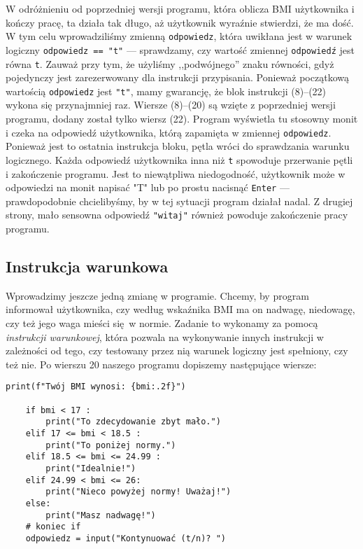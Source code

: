 \documentclass[a4paper]{article}
\begin{document}
W odróżnieniu od poprzedniej wersji programu, która oblicza BMI użytkownika i kończy pracę, ta działa tak długo, aż użytkownik wyraźnie stwierdzi, że ma dość. W tym celu wprowadziliśmy zmienną \texttt{odpowiedz}, która uwikłana jest w warunek logiczny \lstinline|odpowiedz == "t"| --- sprawdzamy, czy wartość zmiennej \texttt{odpowiedź} jest równa \texttt{t}. Zauważ przy tym, że użyliśmy ,,podwójnego'' znaku równości, gdyż pojedynczy jest zarezerwowany dla instrukcji przypisania. Ponieważ początkową wartością \texttt{odpowiedz} jest \texttt{"t"}, mamy gwarancję, że blok instrukcji (8)--(22) wykona się przynajmniej raz. Wiersze (8)--(20) są wzięte z poprzedniej wersji programu, dodany został tylko wiersz (22). Program wyświetla tu stosowny monit i czeka na odpowiedź użytkownika, którą zapamięta w zmiennej \texttt{odpowiedz}. Ponieważ jest to ostatnia instrukcja bloku, pętla wróci do sprawdzania warunku logicznego. Każda odpowiedź użytkownika inna niż \texttt{t} spowoduje przerwanie pętli i zakończenie programu. Jest to niewątpliwa niedogodność, użytkownik może w odpowiedzi na monit napisać "T" lub po prostu nacisnąć \texttt{Enter} --- prawdopodobnie chcielibyśmy, by w tej sytuacji program działał nadal. Z drugiej strony, mało sensowna odpowiedź \texttt{"witaj"} również powoduje zakończenie pracy programu.

\subsection{Instrukcja warunkowa}

Wprowadzimy jeszcze jedną zmianę w programie. Chcemy, by program informował użytkownika, czy według wskaźnika BMI ma on nadwagę, niedowagę, czy też jego waga mieści się w normie. Zadanie to wykonamy za pomocą \emph{instrukcji warunkowej}, która pozwala na wykonywanie innych instrukcji w zależności od tego, czy testowany przez nią warunek logiczny jest spełniony, czy też nie. Po wierszu 20 naszego programu dopiszemy następujące wiersze:

\begin{lstlisting}[firstnumber=20]
    print(f"Twój BMI wynosi: {bmi:.2f}")

    if bmi < 17 :
        print("To zdecydowanie zbyt mało.")
    elif 17 <= bmi < 18.5 :
        print("To poniżej normy.")
    elif 18.5 <= bmi <= 24.99 :
        print("Idealnie!")
    elif 24.99 < bmi <= 26:
        print("Nieco powyżej normy! Uważaj!")
    else:
        print("Masz nadwagę!")
    # koniec if
    odpowiedz = input("Kontynuować (t/n)? ")
\end{lstlisting}
\end{document}
